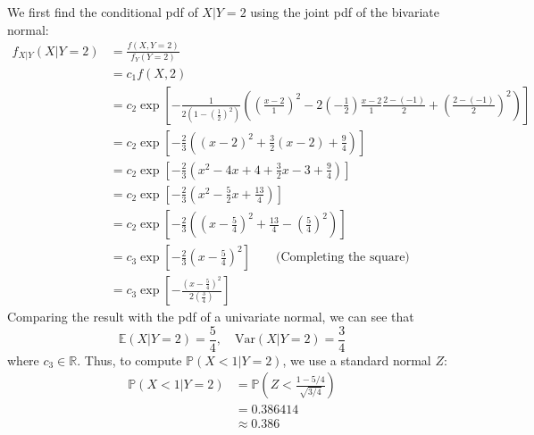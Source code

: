 \documentclass[12pt]{article}
\begin{document}
We first find the conditional pdf of $X | Y = 2$ using the joint pdf of the bivariate normal: \begin{align*}
    f_{X|Y}(X | Y = 2) &= \frac{f(X,Y=2)}{f_Y(Y=2)} \\ 
    &= c_{1} f(X,2) \\ 
    &= c_{2} \exp \left[ -\frac{1}{2(1-(\frac{1}{2})^{2})}\left( \left( \frac{x-2}{1} \right)^{2} - 2\left(-\frac{1}{2}\right) \frac{x-2}{1} \frac{2-(-1)}{2} + \left( \frac{2-(-1)}{2} \right)^{2} \right) \right] \\ 
    &= c_{2} \exp \left[ -\frac{2}{3} \left( (x-2)^{2} + \frac{3}{2}(x-2) + \frac{9}{4} \right) \right] \\ 
    &= c_{2} \exp \left[ -\frac{2}{3}\left(x^{2}-4x+4+\frac{3}{2}x - 3 + \frac{9}{4}\right) \right] \\ 
    &= c_{2} \exp \left[ -\frac{2}{3}(x^{2} - \frac{5}{2}x + \frac{13}{4}) \right] \\ 
    &= c_{2} \exp \left[ -\frac{2}{3} \left( \left(x-\frac{5}{4}\right)^{2} + \frac{13}{4} - \left(\frac{5}{4}\right)^{2} \right) \right] \\ 
    &= c_{3} \exp \left[ -\frac{2}{3}(x-\frac{5}{4})^{2} \right] \qquad \text{(Completing the square)}\\ 
    &= c_{3} \exp \left[ - \frac{(x-\frac{5}{4})^{2}}{2(\frac{3}{4})} \right] 
\end{align*} Comparing the result with the pdf of a univariate normal, we can see that \begin{equation*}
    \mathbb{E}(X | Y = 2) = \frac{5}{4}, \quad \text{Var}(X | Y = 2) = \frac{3}{4}
\end{equation*} where $c_{3} \in \mathbb{R}$. Thus, to compute $ \mathbb{P}(X < 1 | Y = 2)$, we use a standard normal $Z$: \begin{align*}
    \mathbb{P}(X < 1 | Y = 2) &= \mathbb{P}\left(Z < \frac{1- 5 / 4}{\sqrt{3 / 4}}\right) \\ 
    &= 0.386414 \\ 
    &\boxed{\approx 0.386}
\end{align*}
\end{document}
